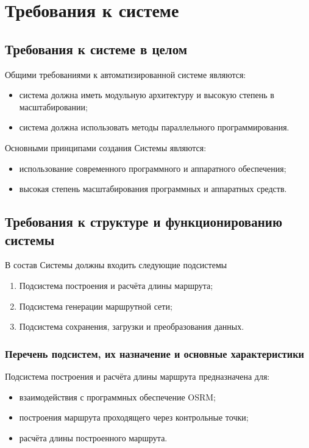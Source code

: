 \vspace{3em}
\chapter{Требования к системе}
\section{Требования к системе в целом}
Общими требованиями к автоматизированной системе являются:
\begin{itemize}
    \item система должна иметь модульную архитектуру и высокую степень в масштабировании;
    \item система должна использовать методы параллельного программирования.
\end{itemize}

Основными принципами создания Системы являются:
\begin{itemize}
    \item использование современного программного и аппаратного обеспечения;
    \item высокая степень масштабирования программных и аппаратных средств.
\end{itemize}

\section{Требования к структуре и функционированию системы}
В состав Системы должны входить следующие подсистемы
\begin{enumerate}
    \item Подсистема построения и расчёта длины маршрута;
    \item Подсистема генерации маршрутной сети;
    \item Подсистема сохранения, загрузки и преобразования данных.
\end{enumerate}

\subsection{Перечень подсистем, их назначение и основные характеристики}
Подсистема построения и расчёта длины маршрута предназначена для:
\begin{itemize}
    \item взаимодействия с программных обеспечение OSRM;
    \item построения маршрута проходящего через контрольные точки;
    \item расчёта длины построенного маршрута.
\end{itemize}

